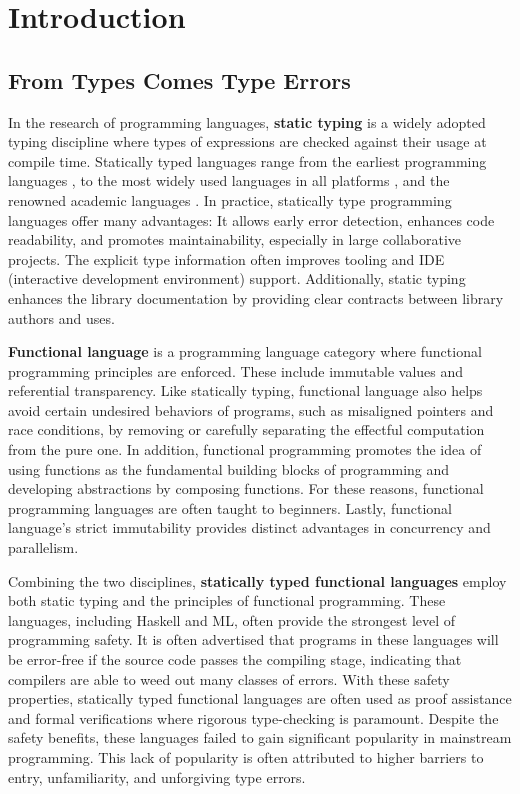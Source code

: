 
\chapter{Introduction}

\label{intro} 

\graphicspath{{Figures/Introduction}}

\section{From Types Comes Type Errors}

In the research of programming languages, \textbf{static typing} is a widely adopted typing discipline where types of expressions are checked against their usage at compile time. Statically typed languages range from the earliest programming languages \cite{Backus1978-xt}, to the most widely used languages in all platforms \cite{Ritchie1978-pa}, and the renowned academic languages \cite{Hudak2007-kn}. In practice, statically type programming languages offer many advantages: It allows early error detection, enhances code readability, and promotes maintainability, especially in large collaborative projects. The explicit type information often improves tooling and IDE (interactive development environment) support. Additionally, static typing enhances the library documentation by providing clear contracts between library authors and uses.

\textbf{Functional language} is a programming language category where functional programming principles are enforced. These include immutable values and referential transparency. Like statically typing, functional language also helps avoid certain undesired behaviors of programs, such as misaligned pointers and race conditions, by removing or carefully separating the effectful computation from the pure one. In addition, functional programming promotes the idea of using functions as the fundamental building blocks of programming and developing abstractions by composing functions. For these reasons, functional programming languages are often taught to beginners. Lastly, functional language's strict immutability provides distinct advantages in concurrency and parallelism.

Combining the two disciplines, \textbf{statically typed functional languages} employ both static typing and the principles of functional programming. These languages, including Haskell and ML, often provide the strongest level of programming safety. It is often advertised that programs in these languages will be error-free if the source code passes the compiling stage, indicating that compilers are able to weed out many classes of errors. With these safety properties, statically typed functional languages are often used as proof assistance and formal verifications where rigorous type-checking is paramount. Despite the safety benefits, these languages failed to gain significant popularity in mainstream programming. This lack of popularity is often attributed to higher barriers to entry, unfamiliarity, and unforgiving type errors.

